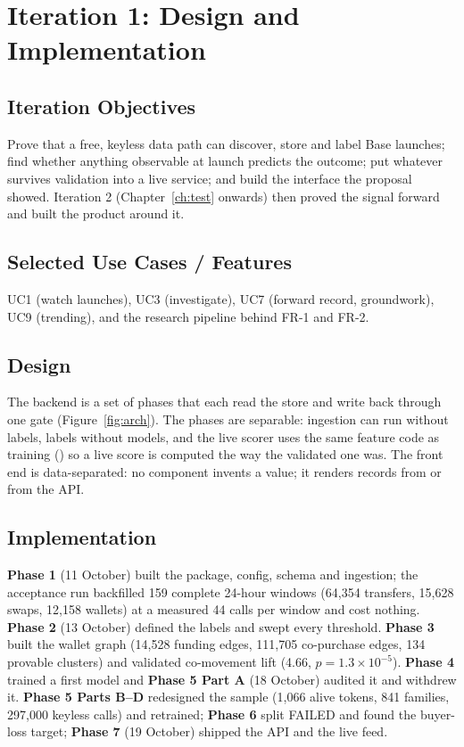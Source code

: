 \chapter{Iteration 1: Design and Implementation}
\label{ch:iter1}

\section{Iteration Objectives}
Prove that a free, keyless data path can discover, store and label Base launches; find whether anything observable at launch predicts the outcome; put whatever survives validation into a live service; and build the interface the proposal showed. Iteration 2 (Chapter~\ref{ch:test} onwards) then proved the signal forward and built the product around it.

\section{Selected Use Cases / Features}
UC1 (watch launches), UC3 (investigate), UC7 (forward record, groundwork), UC9 (trending), and the research pipeline behind FR-1 and FR-2.

\section{Design}
The backend is a set of phases that each read the store and write back through one gate (Figure~\ref{fig:arch}). The phases are separable: ingestion can run without labels, labels without models, and the live scorer uses the same feature code as training () so a live score is computed the way the validated one was. The front end is data-separated: no component invents a value; it renders records from  or from the API.

\section{Implementation}
\textbf{Phase 1} (11 October) built the package, config, schema and ingestion; the acceptance run backfilled 159 complete 24-hour windows (64,354 transfers, 15,628 swaps, 12,158 wallets) at a measured 44 calls per window and cost nothing. \textbf{Phase 2} (13 October) defined the labels and swept every threshold. \textbf{Phase 3} built the wallet graph (14,528 funding edges, 111,705 co-purchase edges, 134 provable clusters) and validated co-movement lift (4.66, $p = 1.3\times10^{-5}$). \textbf{Phase 4} trained a first model and \textbf{Phase 5 Part A} (18 October) audited it and withdrew it. \textbf{Phase 5 Parts B--D} redesigned the sample (1,066 alive tokens, 841 families, 297,000 keyless calls) and retrained; \textbf{Phase 6} split FAILED and found the buyer-loss target; \textbf{Phase 7} (19 October) shipped the API and the live feed.

